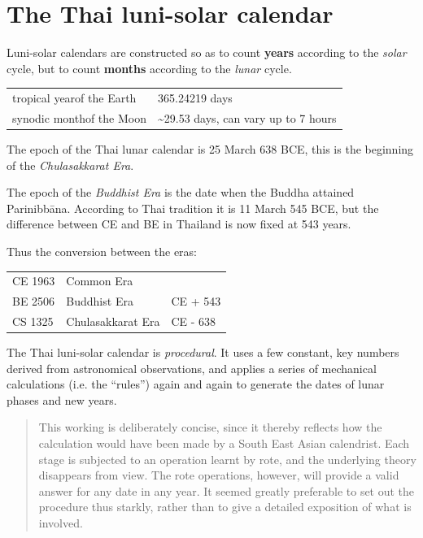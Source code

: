 \documentclass[11pt,oneside]{memoir-article}
\begin{document}
\clearpage

\chapter{The Thai luni-solar calendar}
\label{sec-3}

Luni-solar calendars are constructed so as to count \textbf{years} according to the
\emph{solar} cycle, but to count \textbf{months} according to the \emph{lunar} cycle.

\begin{center}
\begin{tabular}{ll}
tropical year\footnotemark\space of the Earth & 365.24219 days\\
synodic month\footnotemark\space of the Moon & \textasciitilde{}29.53 days, can vary up to 7 hours\\
\end{tabular}
\end{center}

The epoch of the Thai lunar calendar is 25 March 638 BCE, this is the beginning
of the \emph{Chulasakkarat Era}.\autocite{eade1995calendrical}

The epoch of the \emph{Buddhist Era} is the date when the Buddha attained
Parinibbāna. According to Thai tradition it is 11 March 545 BCE, but the
difference between CE and BE in Thailand is now fixed at 543
years.\autocite{eade1995calendrical}

Thus the conversion between the eras:

\begin{center}
\begin{tabular}{lll}
CE 1963 & Common Era & \\
BE 2506 & Buddhist Era & CE + 543\\
CS 1325 & Chulasakkarat Era & CE - 638\\
\end{tabular}
\end{center}

The Thai luni-solar calendar is \emph{procedural}. It uses a few constant,
key numbers derived from astronomical observations, and applies a
series of mechanical calculations (i.e. the ``rules'') again and again
to generate the dates of lunar phases and new years.

\begin{quote}
This working is deliberately concise, since it thereby reflects how
the calculation would have been made by a South East Asian calendrist.
Each stage is subjected to an operation learnt by rote, and the
underlying theory disappears from view. The rote operations, however,
will provide a valid answer for any date in any year. It seemed
greatly preferable to set out the procedure thus starkly, rather than
to give a detailed exposition of what is involved.\autocite{eade-interpolation}
\end{quote}
\end{document}
